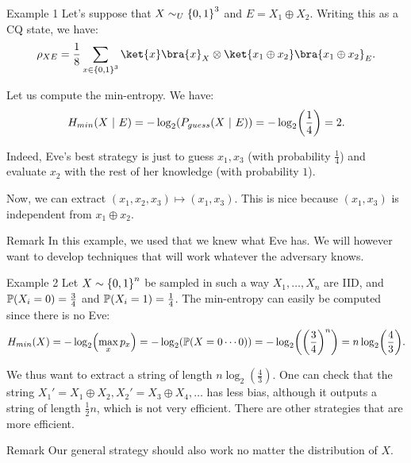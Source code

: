 \documentclass[a4paper]{article}
\begin{document}
\begin{parag}{Example 1}
    Let's suppose that $X \followsdistr_U \left\{0, 1\right\}^3$ and $E = X_1 \oplus X_2$. Writing this as a CQ state, we have: 
    \[\rho_{XE} = \frac{1}{8} \sum_{x \in \left\{0,1\right\}^3} \ket{x}\bra{x}_X \otimes \ket{x_1 \oplus x_2}\bra{x_1 \oplus x_2}_E.\]
    
    Let us compute the min-entropy. We have: 
    \[H_{min}\left(X \suchthat E\right) = -\log_2\left(P_{guess}\left(X \suchthat E\right)\right) = -\log_2\left(\frac{1}{4}\right) = 2.\]

    Indeed, Eve's best strategy is just to guess $x_1, x_3$ (with probability $\frac{1}{4}$) and evaluate $x_2$ with the rest of her knowledge (with probability $1$).

    Now, we can extract $\left(x_1, x_2, x_3\right) \mapsto \left(x_1, x_3\right)$. This is nice because $\left(x_1, x_3\right)$ is independent from $x_1 \oplus x_2$.

    \begin{subparag}{Remark}
        In this example, we used that we knew what Eve has. We will however want to develop techniques that will work whatever the adversary knows.
    \end{subparag}
\end{parag}

\begin{parag}{Example 2}
    Let $X \followsdistr \left\{0, 1\right\}^n$ be sampled in such a way $X_1, \ldots, X_n$ are IID, and $\prob\left(X_i = 0\right) = \frac{3}{4}$ and $\prob\left(X_i = 1\right) = \frac{1}{4}$. The min-entropy can easily be computed since there is no Eve: 
    \[H_{min}\left(X\right) = -\log_2\left(\max_x p_x\right) = -\log_2\left(\prob\left(X = 0\cdots0\right)\right) = -\log_2\left(\left(\frac{3}{4}\right)^n\right) = n \log_2\left(\frac{4}{3}\right).\]
    
    We thus want to extract a string of length $n \log_2\left(\frac{4}{3}\right)$. One can check that the string $X_1' = X_1 \oplus X_2, X_2' = X_3 \oplus X_4, \ldots$ has less bias, although it outputs a string of length $\frac{1}{2} n$, which is not very efficient. There are other strategies that are more efficient.

    \begin{subparag}{Remark}
        Our general strategy should also work no matter the distribution of $X$.
    \end{subparag}
\end{parag}
\end{document}
